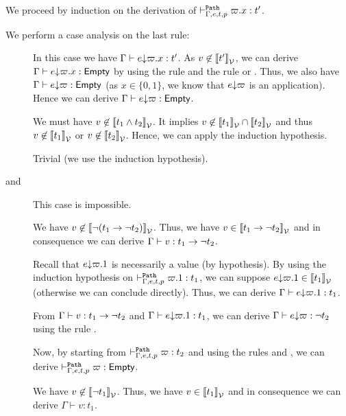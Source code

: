 \documentclass[a4paper]{article}
\theoremstyle{definition}
\begin{document}
        We proceed by induction on the derivation of $\pvdash \Gamma p e t \varpi.x:t'$.

        We perform a case analysis on the last rule:
        \begin{description}
          \item[] In this case we have $\Gamma \vdash \occ e {\varpi.x} : t'$. As $v \not\in \valsemantic{t'}$,
          we can derive $\Gamma \vdash \occ e {\varpi.x} : \Empty$ by using the rule  and the rule  or .
          Thus, we also have $\Gamma \vdash \occ e \varpi : \Empty$ (as $x\in\{0,1\}$, we know that $\occ e \varpi$ is an application).
          Hence we can derive $\Gamma \vdash \occ e \varpi : \Empty$.
          \item[] We must have $v \not\in \valsemantic{t_1 \land t_2}$. It implies $v \not\in \valsemantic{t_1} \cap \valsemantic{t_2}$
          and thus $v \not\in \valsemantic{t_1}$ or $v \not\in \valsemantic{t_2}$. Hence, we can apply the induction hypothesis.
          \item[] Trivial (we use the induction hypothesis).
          \item[ and ] This case is impossible.
          \item[] We have $v \not\in \valsemantic{\neg (\arrow {t_1} {\neg t_2})}$. Thus, we have $v \in \valsemantic{\arrow {t_1} {\neg t_2}}$
          and in consequence we can derive $\Gamma \vdash v:\arrow {t_1} {\neg t_2}$.

          Recall that $\occ e {\varpi.1}$ is necessarily a value (by hypothesis).
          By using the induction hypothesis on $\pvdash \Gamma p e t \varpi.1:t_1$, we can suppose $\occ e {\varpi.1} \in \valsemantic{t_1}$ (otherwise we can conclude directly).
          Thus, we can derive $\Gamma \vdash \occ e {\varpi.1}: t_1$.

          From $\Gamma \vdash v:\arrow {t_1} {\neg t_2}$ and $\Gamma \vdash \occ e {\varpi.1}: t_1$, we can derive $\Gamma \vdash \occ e {\varpi}: \neg t_2$
          using the rule .

          Now, by starting from $\pvdash \Gamma p e t \varpi:t_2$ and using the rules  and , we can derive
          $\pvdash \Gamma p e t \varpi:\Empty$.
        
          \item[] We have $v \not\in \valsemantic{\neg t_1}$. Thus, we have $v \in \valsemantic{t_1}$ and in consequence
          we can derive $\Gamma \vdash v:t_1$. 


\end{description}
\end{document}
